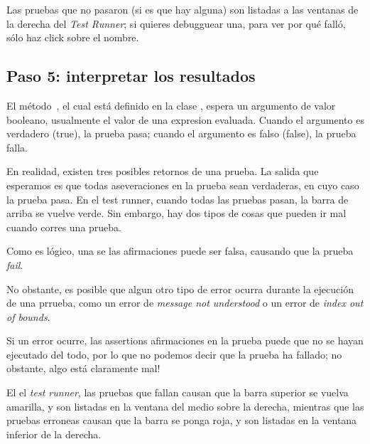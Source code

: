 \documentclass[a4paper,10pt,twoside]{book}
\begin{document}

Las pruebas que no pasaron (si es que hay alguna) son listadas a las ventanas de la derecha del \emph{Test Runner};
si quieres debugguear una, para ver por qué falló, sólo haz click sobre el nombre.


\subsection{Paso 5: interpretar los resultados}

El método \,, el cual está definido en la clase
, espera un argumento de valor booleano, usualmente el valor de 
una expresion evaluada. Cuando el argumento es verdadero (true), la prueba pasa;
cuando el argumento es falso (false), la prueba falla.

En realidad, existen tres posibles retornos de una prueba.
La salida que esperamos es que todas aseveraciones en la prueba sean verdaderas, en cuyo caso la prueba pasa.
En el test runner, cuando todas las pruebas pasan, la barra de arriba se vuelve verde.
Sin embargo, hay dos tipos de cosas que pueden ir mal cuando corres una prueba.

Como es lógico, una se las afirmaciones puede ser falsa, causando que la prueba \emph{fail}. 

No obstante, es posible que algun otro tipo de error ocurra durante la ejecución de una prrueba,
como un error de \emph{message not understood} o un error de \emph{index out of bounds}.

Si un error ocurre, las assertions afirmaciones en la prueba puede que no se hayan ejecutado del todo, 
por lo que no podemos decir que la prueba ha fallado; no obstante, algo está claramente mal!

El el \emph{test runner}, las pruebas que fallan causan que la barra superior se vuelva amarilla, 
y son listadas en la ventana del medio sobre la derecha, mientras que
las pruebas erroneas causan que la barra se ponga roja, y son listadas en la ventana inferior de la derecha.
\end{document}
